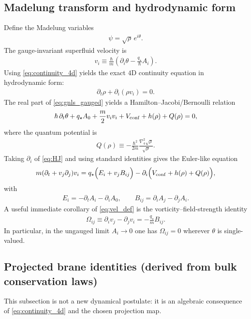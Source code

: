 \documentclass[11pt]{article}
\newcommand{\qstar}{q_\star}
\begin{document}
\subsection{Madelung transform and hydrodynamic form}
Define the Madelung variables
\begin{align}
\psi=\sqrt{\rho}\,e^{i\theta}.
\end{align}
The gauge-invariant superfluid velocity is
\begin{align}
v_i \equiv \frac{\hbar}{m}\left(\partial_i\theta-\frac{\qstar}{\hbar}A_i\right).
\label{eq:vel_def}
\end{align}
Using \eqref{eq:continuity_4d} yields the exact $4$D continuity equation in
hydrodynamic form:
\begin{align}
\partial_t\rho+\partial_i(\rho v_i)=0.
\label{eq:continuity_hydro}
\end{align}
The real part of \eqref{eq:gnls_gauged} yields a Hamilton--Jacobi/Bernoulli relation
\begin{align}
\hbar\,\partial_t\theta + \qstar A_0 + \frac{m}{2}v_iv_i + V_{\rm conf} + h(\rho) + Q(\rho)=0,
\label{eq:HJ}
\end{align}
where the quantum potential is
\begin{align}
Q(\rho)\equiv -\frac{\hbar^2}{2m}\frac{\nabla_4^2\sqrt{\rho}}{\sqrt{\rho}}.
\label{eq:Q_def}
\end{align}
Taking $\partial_i$ of \eqref{eq:HJ} and using standard identities gives the Euler-like
equation
\begin{align}
m(\partial_t+v_j\partial_j)v_i
=
\qstar\Big(E_i+v_j B_{ij}\Big)
-\partial_i\Big(V_{\rm conf}+h(\rho)+Q(\rho)\Big),
\label{eq:euler_bulk}
\end{align}
with
\begin{align}
E_i = -\partial_t A_i-\partial_iA_0,
\qquad
B_{ij}=\partial_iA_j-\partial_jA_i.
\end{align}
A useful immediate corollary of \eqref{eq:vel_def} is the vorticity--field-strength
identity
\begin{align}
\Omega_{ij}\equiv \partial_i v_j-\partial_j v_i = -\frac{\qstar}{m}B_{ij}.
\label{eq:vorticity_identity}
\end{align}
In particular, in the ungauged limit $A_i\to 0$ one has $\Omega_{ij}=0$ wherever $\theta$
is single-valued.

\subsection{Projected brane identities (derived from bulk conservation laws)}
This subsection is not a new dynamical postulate: it is an algebraic consequence of
\eqref{eq:continuity_4d} and the chosen projection map.
\end{document}

